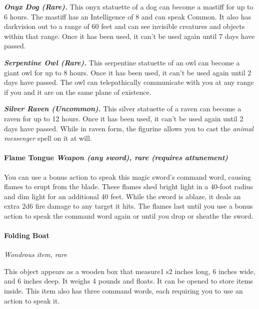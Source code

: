 \documentclass[
]{article}
\begin{document}
\emph{\textbf{Onyx Dog (Rare).}} This onyx statuette of a dog can become
a mastiff for up to 6 hours. The mastiff has an Intelligence of 8 and
can speak Common. It also has darkvision out to a range of 60 feet and
can see invisible creatures and objects within that range. Once it has
been used, it can't be used again until 7 days have passed.

\emph{\textbf{Serpentine Owl (Rare).}} This serpentine statuette of an
owl can become a giant owl for up to 8 hours. Once it has been used, it
can't be used again until 2 days have passed. The owl can telepathically
communicate with you at any range if you and it are on the same plane of
existence.

\emph{\textbf{Silver Raven (Uncommon).}} This silver statuette of a
raven can become a raven for up to 12 hours. Once it has been used, it
can't be used again until 2 days have passed. While in raven form, the
figurine allows you to cast the \emph{animal messenger} spell on it at
will.

\hypertarget{flame-tongue-weapon-any-sword-rare-requires-attunement}{%
\paragraph{\texorpdfstring{Flame Tongue \emph{Weapon (any sword), rare
(requires
attunement)}}{Flame Tongue Weapon (any sword), rare (requires attunement)}}\label{flame-tongue-weapon-any-sword-rare-requires-attunement}}

You can use a bonus action to speak this magic sword's command word,
causing flames to erupt from the blade. These flames shed bright light
in a 40-foot radius and dim light for an additional 40 feet. While the
sword is ablaze, it deals an extra 2d6 fire damage to any target it
hits. The flames last until you use a bonus action to speak the command
word again or until you drop or sheathe the sword.

\hypertarget{folding-boat}{%
\paragraph{Folding Boat}\label{folding-boat}}

\emph{Wondrous item, rare}

This object appears as a wooden box that measure1 s2 inches long, 6
inches wide, and 6 inches deep. It weighs 4 pounds and floats. It can be
opened to store items inside. This item also has three command words,
each requiring you to use an action to speak it.
\end{document}
